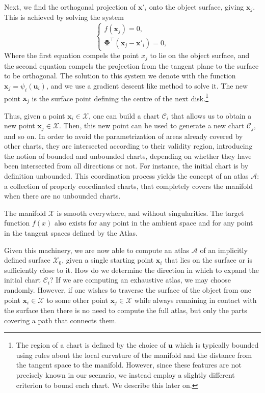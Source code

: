 Next, we find the orthogonal projection of $\mathbf{x}'_i$ onto the object surface, giving $\mathbf{x}_j$. This is achieved by solving the system
\begin{equation}
\begin{cases}
f(\mathbf{x}_j) = 0,
\\
\boldsymbol{\Phi}^\top( \mathbf{x}_j - \mathbf{x}'_i ) = 0,
\end{cases} \label{eq:projection}
\end{equation}
Where the first equation compels the point $x_j$ to lie on the object surface, and the second equation compels the projection from the tangent plane to the surface to be orthogonal. The solution to this system we denote with the function $\mathbf{x}_j = \psi_i(\mathbf{u}_i)$, and we use a gradient descent like method to solve it. The new point $\mathbf{x}_j$ is the surface point defining the centre of the next disk.\footnote{The region of a chart is defined by the choice of $\mathbf{u}$ which is typically bounded using rules about the local curvature of the manifold and the distance from the tangent space to the manifold. However, since these features are not precisely known in our scenario, we instead employ a slightly different criterion to bound each chart. We describe this later on.} 
 

Thus, given a point $\mathbf{x}_i \in \mathcal{X}$, one can build a chart $\mathcal{C}_i$ that allows us to obtain a new point $\mathbf{x}_j \in \mathcal{X}$. Then, this new point can be used to generate a new chart $\mathcal{C}_j$, and so on. In order to avoid the parametrization of areas already covered by other charts, they are intersected according to their validity region, introducing the notion of bounded and unbounded charts, depending on whether they have been intersected from all directions or not. For instance, the initial chart is by definition unbounded. This coordination process yields the concept of an atlas $\mathcal{A}$: a collection of properly coordinated charts, that completely covers the manifold when there are no unbounded charts. %

The manifold $\mathcal{X}$ is smooth everywhere, and without singularities. The target function $f(x)$ also exists for any point in the ambient space and for any point in the tangent spaces defined by the Atlas.

Given this machinery, we are now able to compute an atlas $\mathcal{A}$ of an implicitly defined surface $\mathcal{X_0}$, given a single starting point $\mathbf{x}_i$ that lies on the surface or is sufficiently close to it. How do we determine the direction in which to expand the initial chart $\mathcal{C}_i$? If we are computing an exhaustive atlas, we may choose randomly. However, if one wishes to traverse the surface of the object from one point $\mathbf{x}_i \in \mathcal{X}$ to some other point $\mathbf{x}_j \in \mathcal{X}$ while always remaining in contact with the surface then there is no need to compute the full atlas, but only the parts covering a path that connects them. 

